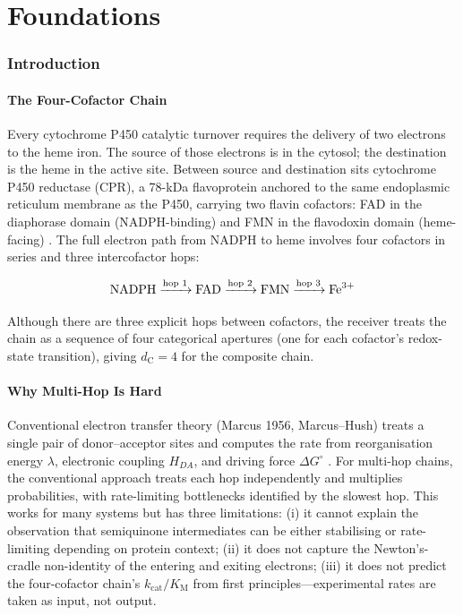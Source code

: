 \documentclass[11pt,twocolumn,a4paper]{article}
\theoremstyle{definition}
\theoremstyle{remark}
\newcommand{\dC}{d_{\mathrm{C}}}
\newcommand{\kcat}{k_{\mathrm{cat}}}
\newcommand{\KM}{K_{\mathrm{M}}}
\begin{document}

\part{Foundations}

\section{Introduction}
\label{sec:introduction}

\subsection{The Four-Cofactor Chain}

Every cytochrome P450 catalytic turnover requires the delivery of two
electrons to the heme iron. The source of those electrons is 
in the cytosol; the destination is the heme  in the active
site. Between source and destination sits cytochrome P450 reductase (CPR),
a 78-kDa flavoprotein anchored to the same endoplasmic reticulum membrane
as the P450, carrying two flavin cofactors: FAD in the diaphorase domain
(NADPH-binding) and FMN in the flavodoxin domain (heme-facing)
\citep{murataliev2004, hamdane2009}. The full electron path from NADPH
to heme involves four cofactors in series and three intercofactor hops:

\begin{equation*}
\ce{NADPH} \xrightarrow{\text{hop 1}} \ce{FAD} \xrightarrow{\text{hop 2}} \ce{FMN} \xrightarrow{\text{hop 3}} \ce{Fe^{3+}}
\end{equation*}

Although there are three explicit hops between cofactors, the receiver
treats the chain as a sequence of four categorical apertures (one for
each cofactor's redox-state transition), giving $\dC = 4$ for the
composite chain.

\subsection{Why Multi-Hop Is Hard}

Conventional electron transfer theory (Marcus 1956, Marcus--Hush) treats a
single pair of donor--acceptor sites and computes the rate from
reorganisation energy $\lambda$, electronic coupling $H_{DA}$, and driving
force $\Delta G^\circ$ \citep{marcus1956, marcus1985}. For multi-hop chains,
the conventional approach treats each hop independently and multiplies
probabilities, with rate-limiting bottlenecks identified by the slowest
hop. This works for many systems but has three limitations: (i) it cannot
explain the observation that semiquinone intermediates can be either
stabilising or rate-limiting depending on protein context; (ii) it does
not capture the Newton's-cradle non-identity of the entering and exiting
electrons; (iii) it does not predict the four-cofactor chain's
$\kcat/\KM$ from first principles---experimental rates are taken as input,
not output.
\end{document}
